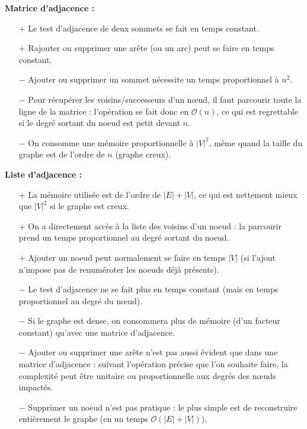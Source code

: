 \ifprof
\begin{corrige}
\textbf{Matrice d'adjacence :}
\begin{itemize}
\item [$+$] Le test d’adjacence de deux sommets se fait en temps constant.
\item [$+$] Rajouter ou supprimer une arête (ou un arc) peut se faire en temps constant.
\item [$-$] Ajouter ou supprimer un sommet nécessite un temps proportionnel à $n^2$.
\item [$-$] Pour récupérer les voisins/successeurs d’un nœud, il faut parcourir toute la ligne de la matrice :
l’opération se fait donc en $\mathcal{O}(n)$, ce qui est regrettable si le degré sortant du noeud est petit devant $n$.
\item [$-$] On consomme une mémoire proportionnelle à $|V|^2$, même quand la taille du graphe est de l’ordre de $n$ (graphe creux).
\end{itemize}


\textbf{Liste d'adjacence :}
\begin{itemize}
\item [$+$] La mémoire utilisée est de l’ordre de $|E| + |V|$, ce qui est nettement mieux que $|V|^2$ si le graphe est
creux.
\item [$+$] On a directement accès à la liste des voisins d’un noeud : la parcourir prend un temps proportionnel
au degré sortant du noeud.%
\item [$+$] Ajouter un noeud peut normalement se faire en temps $|V|$ (si l’ajout n’impose pas de renuméroter
les noeuds déjà présents).
\item [$-$]  Le test d’adjacence ne se fait plus en temps constant (mais en temps proportionnel au degré du
nœud).
\item [$-$] Si le graphe est dense, on consommera plus de mémoire (d’un facteur constant) qu’avec une matrice d’adjacence.
\item [$-$] Ajouter ou supprimer une arête n’est pas aussi évident que dans une matrice d’adjacence : suivant
l’opération précise que l’on souhaite faire, la complexité peut être unitaire ou proportionnelle aux
degrés des nœuds impactés.
\item [$-$] Supprimer un noeud n’est pas pratique : le plus simple est de reconstruire entièrement le graphe (en
un temps $\mathcal{O}\left(|E| + |V|\right)$).
\end{itemize}

\end{corrige}
\else
\fi

